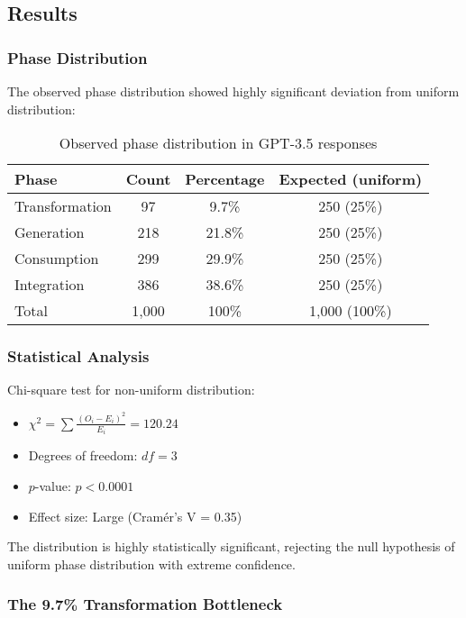 \documentclass[pmlr,onecolumn]{jmlr}
\begin{document}
\subsection{Results}

\subsubsection{Phase Distribution}

The observed phase distribution showed highly significant deviation from uniform distribution:

\begin{table}[h]
\centering
\begin{tabular}{lccc}
\hline
\textbf{Phase} & \textbf{Count} & \textbf{Percentage} & \textbf{Expected (uniform)} \\
\hline
Transformation & 97 & 9.7\% & 250 (25\%) \\
Generation & 218 & 21.8\% & 250 (25\%) \\
Consumption & 299 & 29.9\% & 250 (25\%) \\
Integration & 386 & 38.6\% & 250 (25\%) \\
\hline
Total & 1,000 & 100\% & 1,000 (100\%) \\
\end{tabular}
\caption{Observed phase distribution in GPT-3.5 responses}
\end{table}

\subsubsection{Statistical Analysis}

Chi-square test for non-uniform distribution:
\begin{itemize}
\item $\chi^2 = \sum \frac{(O_i - E_i)^2}{E_i} = 120.24$
\item Degrees of freedom: $df = 3$
\item $p$-value: $p < 0.0001$
\item Effect size: Large (Cram\'er's V = 0.35)
\end{itemize}

The distribution is highly statistically significant, rejecting the null hypothesis of uniform phase distribution with extreme confidence.

\subsubsection{The 9.7\% Transformation Bottleneck}
\end{document}

